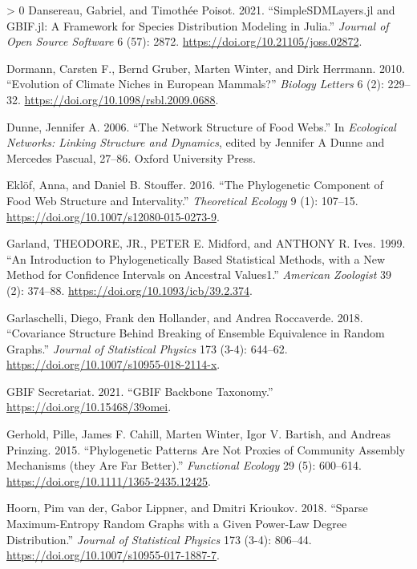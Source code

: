 \documentclass[11pt]{article}
\newlength{\cslhangindent}
\newenvironment{CSLReferences}[3] %
 {%
  \setlength{\parindent}{0pt}
  \ifodd #1 \everypar{\setlength{\hangindent}{\cslhangindent}}\ignorespaces\fi
  \ifnum #2 > 0
  \setlength{\parskip}{#2\baselineskip}
  \fi
 }%
 {}
\begin{document}
\begin{CSLReferences}{1}{0}
\leavevmode\hypertarget{ref-Dansereau2021SimJl}{}%
Dansereau, Gabriel, and Timothée Poisot. 2021. {``SimpleSDMLayers.jl and
GBIF.jl: A Framework for Species Distribution Modeling in Julia.''}
\emph{Journal of Open Source Software} 6 (57): 2872.
\url{https://doi.org/10.21105/joss.02872}.

\leavevmode\hypertarget{ref-Dormann2010EvoCli}{}%
Dormann, Carsten F., Bernd Gruber, Marten Winter, and Dirk Herrmann.
2010. {``Evolution of Climate Niches in European Mammals?''}
\emph{Biology Letters} 6 (2): 229--32.
\url{https://doi.org/10.1098/rsbl.2009.0688}.

\leavevmode\hypertarget{ref-Dunne2006NetStr}{}%
Dunne, Jennifer A. 2006. {``The Network Structure of Food Webs.''} In
\emph{Ecological Networks: Linking Structure and Dynamics}, edited by
Jennifer A Dunne and Mercedes Pascual, 27--86. Oxford University Press.

\leavevmode\hypertarget{ref-Eklof2016PhyCom}{}%
Eklöf, Anna, and Daniel B. Stouffer. 2016. {``The Phylogenetic Component
of Food Web Structure and Intervality.''} \emph{Theoretical Ecology} 9
(1): 107--15. \url{https://doi.org/10.1007/s12080-015-0273-9}.

\leavevmode\hypertarget{ref-Garland1999IntPhy}{}%
Garland, THEODORE, JR., PETER E. Midford, and ANTHONY R. Ives. 1999.
{``An Introduction to Phylogenetically Based Statistical Methods, with a
New Method for Confidence Intervals on Ancestral Values1.''}
\emph{American Zoologist} 39 (2): 374--88.
\url{https://doi.org/10.1093/icb/39.2.374}.

\leavevmode\hypertarget{ref-Garlaschelli2018CovStr}{}%
Garlaschelli, Diego, Frank den Hollander, and Andrea Roccaverde. 2018.
{``Covariance Structure Behind Breaking of Ensemble Equivalence in
Random Graphs.''} \emph{Journal of Statistical Physics} 173 (3-4):
644--62. \url{https://doi.org/10.1007/s10955-018-2114-x}.

\leavevmode\hypertarget{ref-GBIFSecretariat2021GbiBac}{}%
GBIF Secretariat. 2021. {``GBIF Backbone Taxonomy.''}
\url{https://doi.org/10.15468/39omei}.

\leavevmode\hypertarget{ref-Gerhold2015PhyPat}{}%
Gerhold, Pille, James F. Cahill, Marten Winter, Igor V. Bartish, and
Andreas Prinzing. 2015. {``Phylogenetic Patterns Are Not Proxies of
Community Assembly Mechanisms (they Are Far Better).''} \emph{Functional
Ecology} 29 (5): 600--614.
\url{https://doi.org/10.1111/1365-2435.12425}.

\leavevmode\hypertarget{ref-vanderHoorn2018SpaMax}{}%
Hoorn, Pim van der, Gabor Lippner, and Dmitri Krioukov. 2018. {``Sparse
Maximum-Entropy Random Graphs with a Given Power-Law Degree
Distribution.''} \emph{Journal of Statistical Physics} 173 (3-4):
806--44. \url{https://doi.org/10.1007/s10955-017-1887-7}.


\end{CSLReferences}
\end{document}
